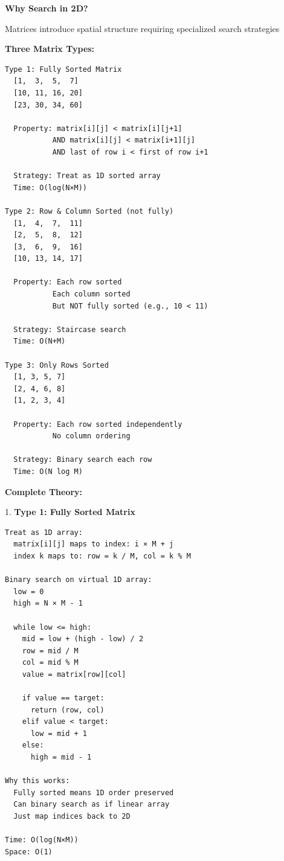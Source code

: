 \documentclass[11pt,a4paper,oneside]{book}
\begin{document}
\begin{tcolorbox}[
    enhanced,breakable,
    colback=white,
    colframe=deepblue,
    boxrule=1.5pt,
    arc=3mm,
    title=\textbf{The Matrix Search Paradigm}
]
\textbf{Why Search in 2D?}

Matrices introduce spatial structure requiring specialized search strategies

\textbf{Three Matrix Types:}
\begin{verbatim}
Type 1: Fully Sorted Matrix
  [1,  3,  5,  7]
  [10, 11, 16, 20]
  [23, 30, 34, 60]
  
  Property: matrix[i][j] < matrix[i][j+1]
           AND matrix[i][j] < matrix[i+1][j]
           AND last of row i < first of row i+1
  
  Strategy: Treat as 1D sorted array
  Time: O(log(N×M))

Type 2: Row & Column Sorted (not fully)
  [1,  4,  7,  11]
  [2,  5,  8,  12]
  [3,  6,  9,  16]
  [10, 13, 14, 17]
  
  Property: Each row sorted
           Each column sorted
           But NOT fully sorted (e.g., 10 < 11)
  
  Strategy: Staircase search
  Time: O(N+M)

Type 3: Only Rows Sorted
  [1, 3, 5, 7]
  [2, 4, 6, 8]
  [1, 2, 3, 4]
  
  Property: Each row sorted independently
           No column ordering
  
  Strategy: Binary search each row
  Time: O(N log M)
\end{verbatim}

\textbf{Complete Theory:}

1. \textbf{Type 1: Fully Sorted Matrix}
\begin{verbatim}
Treat as 1D array:
  matrix[i][j] maps to index: i × M + j
  index k maps to: row = k / M, col = k % M

Binary search on virtual 1D array:
  low = 0
  high = N × M - 1
  
  while low <= high:
    mid = low + (high - low) / 2
    row = mid / M
    col = mid % M
    value = matrix[row][col]
    
    if value == target:
      return (row, col)
    elif value < target:
      low = mid + 1
    else:
      high = mid - 1

Why this works:
  Fully sorted means 1D order preserved
  Can binary search as if linear array
  Just map indices back to 2D

Time: O(log(N×M))
Space: O(1)


\end{verbatim}
\end{tcolorbox}
\end{document}
